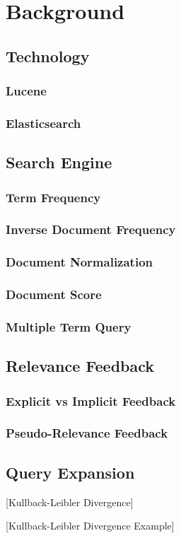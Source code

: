 \chapter{Background}
\label{ch:background}

\section{Technology}

\subsection{Lucene}

\subsection{Elasticsearch}

\section{Search Engine}

\subsection{Term Frequency}

\subsection{Inverse Document Frequency}

\subsection{Document Normalization}

\subsection{Document Score}
\label{sec:doc-score}

\subsection{Multiple Term Query}

\section{Relevance Feedback}

\subsection{Explicit vs Implicit Feedback}

\subsection{Pseudo-Relevance Feedback}

\section{Query Expansion}
\label{sec:query-expansion}

[Kullback-Leibler Divergence]


[Kullback-Leibler Divergence Example]
